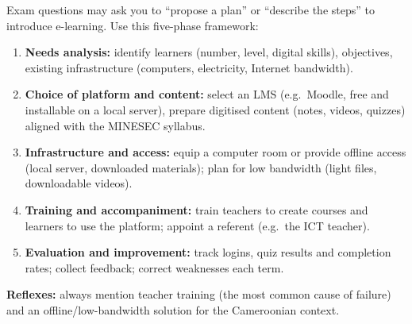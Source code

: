 \documentclass[11pt]{article}
\begin{document}
\begin{methode}
Exam questions may ask you to ``propose a plan'' or ``describe the steps'' to introduce e-learning. Use this five-phase framework:
\begin{enumerate}
\item \textbf{Needs analysis:} identify learners (number, level, digital skills), objectives, existing infrastructure (computers, electricity, Internet bandwidth).
\item \textbf{Choice of platform and content:} select an LMS (e.g.\ Moodle, free and installable on a local server), prepare digitised content (notes, videos, quizzes) aligned with the MINESEC syllabus.
\item \textbf{Infrastructure and access:} equip a computer room or provide offline access (local server, downloaded materials); plan for low bandwidth (light files, downloadable videos).
\item \textbf{Training and accompaniment:} train teachers to create courses and learners to use the platform; appoint a referent (e.g.\ the ICT teacher).
\item \textbf{Evaluation and improvement:} track logins, quiz results and completion rates; collect feedback; correct weaknesses each term.
\end{enumerate}
\textbf{Reflexes:} always mention teacher training (the most common cause of failure) and an offline/low-bandwidth solution for the Cameroonian context.
\end{methode}
\end{document}
